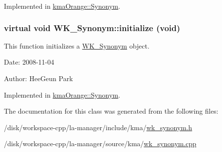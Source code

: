 Implemented in \hyperlink{classkmaOrange_1_1Synonym_af600c78524ff2f1bfef1b10219f91e0}{kmaOrange::Synonym}.\hypertarget{classWK__Synonym_f76814cfdd7eb55208f0370481aaa398}{
\subsubsection[{initialize}]{\setlength{\rightskip}{0pt plus 5cm}virtual void WK\_\-Synonym::initialize (void)}}
\label{classWK__Synonym_f76814cfdd7eb55208f0370481aaa398}


This function initializes a \hyperlink{classWK__Synonym}{WK\_\-Synonym} object. 

\begin{Desc}
\item[Date:]2008-11-04 \end{Desc}
\begin{Desc}
\item[Author:]HeeGeun Park \end{Desc}


Implemented in \hyperlink{classkmaOrange_1_1Synonym_7628a45375a8b5ac25f5f572a0e0b368}{kmaOrange::Synonym}.

The documentation for this class was generated from the following files:\begin{CompactItemize}
\item 
/disk/workspace-cpp/la-manager/include/kma/\hyperlink{wk__synonym_8h}{wk\_\-synonym.h}\item 
/disk/workspace-cpp/la-manager/source/kma/\hyperlink{wk__synonym_8cpp}{wk\_\-synonym.cpp}\end{CompactItemize}
